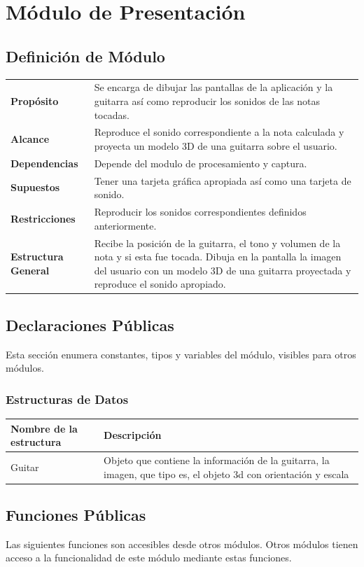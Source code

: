 \documentclass[a4paper,12pt]{article}
\begin{document}
\section{Módulo de Presentación}
\label{sec:presentacion}
\subsection{Definición de Módulo}
\begin{tabularx}{\textwidth}{p{25mm} X}
        \textbf{Propósito} & Se encarga de dibujar las pantallas de la aplicación y la guitarra así como reproducir los sonidos de las notas tocadas.\\
        \textbf{Alcance} & Reproduce el sonido correspondiente a la nota calculada y proyecta un modelo 3D de una guitarra sobre el usuario.\\
        \textbf{Dependencias} & Depende del modulo de procesamiento y captura.\\
        \textbf{Supuestos} & Tener una tarjeta gráfica apropiada así como una tarjeta de sonido.\\
        \textbf{Restricciones} & Reproducir los sonidos correspondientes definidos anteriormente.\\
        \textbf{Estructura General} & Recibe la posición de la guitarra, el
        tono y volumen de la nota y si esta fue tocada. Dibuja en la pantalla
        la imagen del usuario con un modelo 3D de una guitarra proyectada y
        reproduce el sonido apropiado.\\
\end{tabularx}
\subsection{Declaraciones Públicas}
Esta sección enumera constantes, tipos y variables del módulo, visibles para
otros módulos.
\subsubsection{Estructuras de Datos}
\begin{tabular}{| p{30mm} | p{10cm} |}
        \hline
        \textbf{Nombre de la \mbox{estructura}} & \textbf{Descripción} \\
        \hline
        Guitar & Objeto que contiene la información de la guitarra, la imagen, que tipo es, el objeto 3d con orientación y escala\\
        \hline
\end{tabular}
\subsection{Funciones Públicas}
Las siguientes funciones son accesibles desde otros módulos. Otros módulos
tienen acceso a la funcionalidad de este módulo mediante estas funciones.~\\
\end{document}
